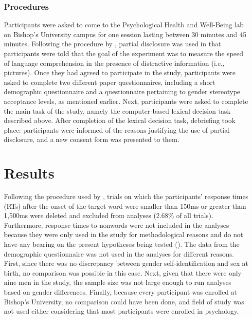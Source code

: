 \documentclass[serif, authordate, twocolumn, empirical]{jote-article}
\begin{document}
\subsubsection*{Procedures}
Participants were asked to come to the Psychological Health and Well-Being lab on Bishop’s University campus for one session lasting between 30 minutes and 45 minutes. Following the procedure by \textcite{BartholowHeinz2006}, partial disclosure was used in that participants were told that the goal of the experiment was to measure the speed of language comprehension in the presence of distractive information (i.e., pictures). Once they had agreed to participate in the study, participants were asked to complete two different paper questionnaires, including a short demographic questionnaire and a questionnaire pertaining to gender stereotype acceptance levels, as mentioned earlier. Next, participants were asked to complete the main task of the study, namely the computer-based lexical decision task described above. After completion of the lexical decision task, debriefing took place: participants were informed of the reasons justifying the use of partial disclosure, and a new consent form was presented to them. 


{}
\section*{Results} %
\label{sec:results}

Following the procedure used by \textcite{BartholowHeinz2006}, trials on which the participants’ response times (RTs) after the onset of the target word were smaller than 150ms or greater than 1,500ms were deleted and excluded from analyses (2.68$\%$  of all trials). Furthermore, response times to nonwords were not included in the analyses because they were only used in the study for methodological reasons and do not have any bearing on the present hypotheses being tested (). The data from the demographic questionnaire was not used in the analyses for different reasons. First, since there was no discrepancy between gender self-identification and sex at birth, no comparison was possible in this case. Next, given that there were only nine men in the study, the sample size was not large enough to run analyses based on gender differences. Finally, because every participant was enrolled at Bishop’s University, no comparison could have been done, and field of study was not used either considering that most participants were enrolled in psychology. 
\end{document}
